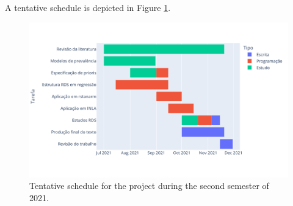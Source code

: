 A tentative schedule is depicted in Figure \ref{fig:schedule}. 

\begin{figure}[!ht]
    \centering
    \includegraphics[width = \textwidth]{../../images/gantt-chart-schedule.png}
    \caption{Tentative schedule for the project during the second semester of 2021.}
    \label{fig:schedule}
  \end{figure}